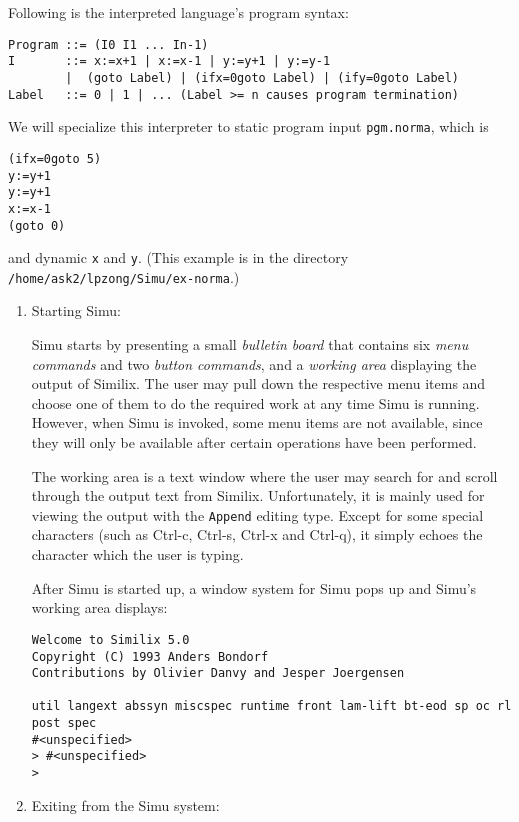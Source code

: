 \begin{sloppypar}
   Following is the interpreted language's program syntax:

\begin{verbatim}
Program ::= (I0 I1 ... In-1)
I       ::= x:=x+1 | x:=x-1 | y:=y+1 | y:=y-1
        |  (goto Label) | (ifx=0goto Label) | (ify=0goto Label)
Label   ::= 0 | 1 | ... (Label >= n causes program termination)
\end{verbatim}

   We will specialize this interpreter to static program input
{\tt pgm.norma}, which is

\begin{verbatim}
(ifx=0goto 5)
y:=y+1
y:=y+1
x:=x-1
(goto 0)
\end{verbatim}

\noindent and dynamic {\tt x} and {\tt y}. (This example is in the directory
{\tt /home/ask2/lpzong/Simu/ex-norma}.)


\begin{enumerate}
\item Starting Simu:

     Simu starts by presenting a small {\it bulletin board} that
contains six {\it menu commands} and two {\it button commands}, and a
{\it working area} displaying the output of Similix. The user may pull
down the respective menu items and choose one of them to do the
required work at any time Simu is running.  However, when Simu is
invoked, some menu items are not available, since they will only be
available after certain operations have been performed.

     The working area is a text window where the user may search for
and scroll through the output text from Similix. Unfortunately, it is
mainly used for viewing the output with the {\tt Append} editing type.
Except for some special characters (such as Ctrl-c, Ctrl-s, Ctrl-x and
Ctrl-q), it simply echoes the character which the user is typing.

   After Simu is started up, a window system for Simu pops up and
Simu's working area displays:

\begin{verbatim}
Welcome to Similix 5.0
Copyright (C) 1993 Anders Bondorf
Contributions by Olivier Danvy and Jesper Joergensen

util langext abssyn miscspec runtime front lam-lift bt-eod sp oc rl post spec
#<unspecified>
> #<unspecified>
>
\end{verbatim}

\item Exiting from the Simu system:


\end{enumerate}
\end{sloppypar}
